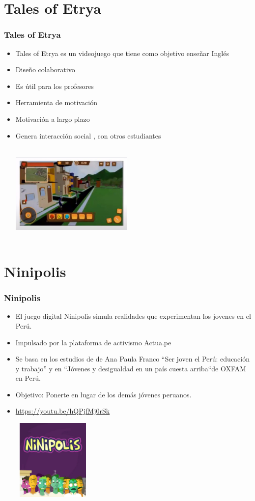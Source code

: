 \documentclass[11pt]{beamer}
\begin{document}
\section{Tales of Etrya}
\begin{frame}
\frametitle{Tales of Etrya}
\begin{itemize}

\item Tales of Etrya es un videojuego que tiene como objetivo enseñar Inglés


\item Diseño colaborativo
\item Es útil para los profesores
\item  Herramienta de motivación 
\item Motivación a largo plazo
\item Genera interacción social , con otros estudiantes

\includegraphics[width=6cm, height=5cm]{images/toe1.png}

\end{itemize}
\end{frame}

\section{Ninipolis}
\begin{frame}
\frametitle{Ninipolis}
\begin{itemize}
\item El juego digital Ninipolis simula realidades que experimentan los jovenes en el Perú.
\item Impulsado por la plataforma de activismo Actua.pe 
\item Se basa en los estudios de de Ana Paula Franco “Ser joven el Perú: educación y trabajo” y en “Jóvenes y desigualdad en un país cuesta arriba“de OXFAM en Perú.
\item Objetivo: Ponerte en lugar de los demás  jóvenes peruanos.
\item \href {https://youtu.be/hQPjfMj0rSk}{https://youtu.be/hQPjfMj0rSk}

\includegraphics[width=4cm, height=4cm]{images/ninipolis1.png}

\end{itemize}
\end{frame}
\end{document}
